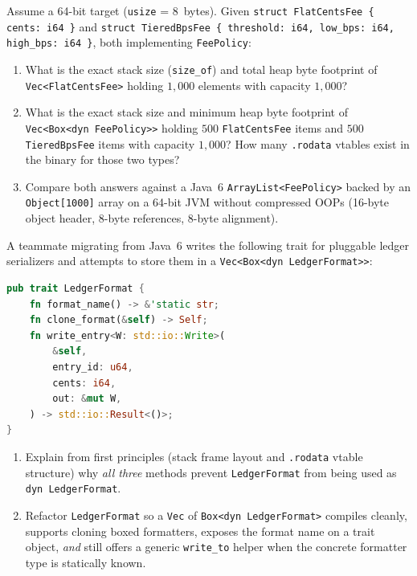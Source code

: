 \begin{exercise}
\label{ch06:ex-byte-counts}
Assume a 64-bit target (\texttt{usize} = 8~bytes). Given \texttt{struct FlatCentsFee \{ cents: i64 \}} and \texttt{struct TieredBpsFee \{ threshold: i64, low\_bps: i64, high\_bps: i64 \}}, both implementing \texttt{FeePolicy}:
\begin{enumerate}
  \item What is the exact stack size (\texttt{size\_of}) and total heap byte footprint of \texttt{Vec<FlatCentsFee>} holding $1{,}000$ elements with capacity $1{,}000$?
  \item What is the exact stack size and minimum heap byte footprint of \texttt{Vec<Box<dyn FeePolicy>>} holding $500$ \texttt{FlatCentsFee} items and $500$ \texttt{TieredBpsFee} items with capacity $1{,}000$? How many \texttt{.rodata} vtables exist in the binary for those two types?
  \item Compare both answers against a Java~6 \texttt{ArrayList<FeePolicy>} backed by an \texttt{Object[1000]} array on a 64-bit JVM without compressed OOPs (16-byte object header, 8-byte references, 8-byte alignment).
\end{enumerate}
\end{exercise}

\begin{exercise}
\label{ch06:ex-dyn-safety}
A teammate migrating from Java~6 writes the following trait for pluggable ledger serializers and attempts to store them in a \texttt{Vec<Box<dyn LedgerFormat>>}:
\begin{lstlisting}[language=Rust]
pub trait LedgerFormat {
    fn format_name() -> &'static str;
    fn clone_format(&self) -> Self;
    fn write_entry<W: std::io::Write>(
        &self,
        entry_id: u64,
        cents: i64,
        out: &mut W,
    ) -> std::io::Result<()>;
}
\end{lstlisting}
\begin{enumerate}
  \item Explain from first principles (stack frame layout and \texttt{.rodata} vtable structure) why \emph{all three} methods prevent \texttt{LedgerFormat} from being used as \texttt{dyn LedgerFormat}.
  \item Refactor \texttt{LedgerFormat} so a \texttt{Vec} of \texttt{Box<dyn LedgerFormat>} compiles cleanly, supports cloning boxed formatters, exposes the format name on a trait object, \emph{and} still offers a generic \texttt{write\_to} helper when the concrete formatter type is statically known.
\end{enumerate}
\end{exercise}

